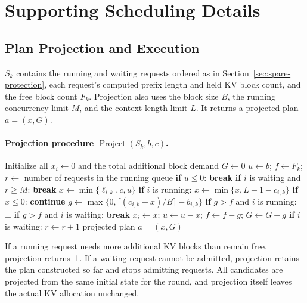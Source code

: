 \section{Supporting Scheduling Details}
\label{app:spare-details}

\subsection{Plan Projection and Execution}
\label{app:spare-projection}

$S_k$ contains the running and waiting requests ordered as in Section~\ref{sec:spare-protection}, each request's computed prefix length and held KV block count, and the free block count $F_k$. Projection also uses the block size $B$, the running concurrency limit $M$, and the context length limit $L$. It returns a projected plan $a=(x,G)$.

\paragraph{Projection procedure $\operatorname{Project}(S_k,b,c)$.}
\begingroup
{}
\small
\begin{algorithmic}[1]
\State Initialize all $x_i\gets0$ and the total additional block demand $G\gets0$
\State $u\gets b$; $f\gets F_k$; $r\gets$ number of requests in the running queue
    \State \textbf{if} $u\le0$: \textbf{break}
    \State \textbf{if} $i$ is waiting and $r\ge M$: \textbf{break}
    \State $x\gets\min\{\ell_{i,k},c,u\}$
    \Statex \hspace{\algorithmicindent}\textbf{if} $i$ is running: $x\gets\min\{x,L-1-c_{i,k}\}$
    \State \textbf{if} $x\le0$: \textbf{continue}
    \State $g\gets\max\{0,\lceil(c_{i,k}+x)/B\rceil-b_{i,k}\}$
    \State \textbf{if} $g>f$ and $i$ is running: \Return $\bot$
    \State \textbf{if} $g>f$ and $i$ is waiting: \textbf{break}
    \State $x_i\gets x$; $u\gets u-x$; $f\gets f-g$; $G\gets G+g$
    \State \textbf{if} $i$ is waiting: $r\gets r+1$
\EndFor
\State \Return projected plan $a=(x,G)$
\end{algorithmic}
\endgroup

If a running request needs more additional KV blocks than remain free, projection returns $\bot$. If a waiting request cannot be admitted, projection retains the plan constructed so far and stops admitting requests. All candidates are projected from the same initial state for the round, and projection itself leaves the actual KV allocation unchanged.

